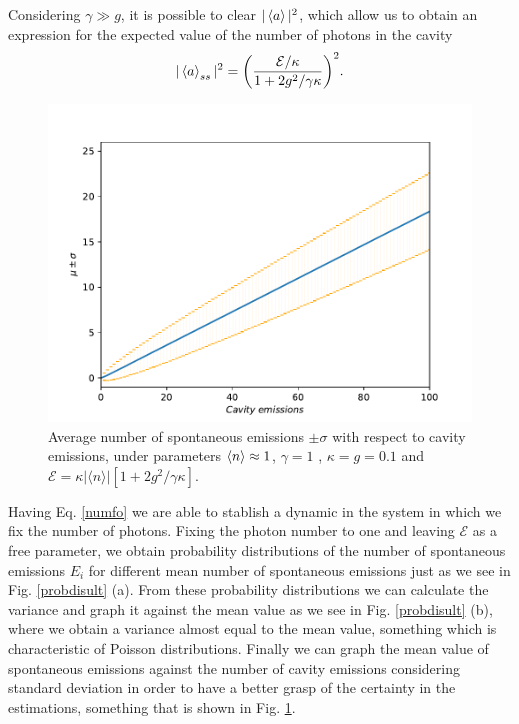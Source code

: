 \documentclass[conference]{IEEEtran}
\begin{document}
Considering $\gamma \gg g$, it is possible to clear $|\expval{a}|^2$, which allow us to obtain an expression for the expected value of the number of photons in the cavity
\begin{equation} \label{numfo}
|\expval{a}_{ss}|^2 = \bigg(\frac{\mathcal{E}/\kappa}{1 + 2g^2/\gamma \kappa}\bigg)^2.
\end{equation}
\begin{figure}[!t]  
\centering
\includegraphics[scale = 0.45]{newsigmaeng.pdf}
\caption{\small{Average number of spontaneous emissions $\pm \sigma$ with respect to cavity emissions, under parameters $\expval{n} \approx 1$, $\gamma = 1$ , $\kappa = g = 0.1$ and $\mathcal{E} =  \kappa |\langle n \rangle|[1 + 2g^2/\gamma \kappa]$.}}
\label{graph}
\end{figure} 
Having Eq. \eqref{numfo} we are able to stablish a dynamic in the system in which we fix the number of photons. Fixing the photon number to one and leaving $\mathcal{E}$ as a free parameter, we obtain probability distributions of the number of spontaneous emissions $E_i$ for different mean number of spontaneous emissions just as we see in Fig. \ref{probdisult} (a). From these probability distributions we can calculate the variance and graph it against the mean value as we see in Fig. \ref{probdisult} (b), where we obtain a variance almost equal to the mean value, something which is characteristic of Poisson distributions. 
Finally we can graph the mean value of spontaneous emissions against the number of cavity emissions considering standard deviation in order to have a better grasp of the certainty in the estimations, something that is shown in Fig. \ref{graph}.
\end{document}

